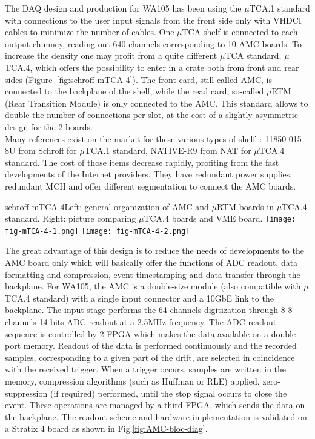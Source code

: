 The DAQ design and production for WA105 has been using the $\mu$TCA.1 standard with connections to the user input signals from the front side only with VHDCI cables to minimize the number of cables. One $\mu$TCA shelf is connected to each output chimney, reading out 640 channels corresponding to 10 AMC boards. To increase the density one may profit from a quite different $\mu$TCA standard, $\mu$TCA.4, which offers the possibility to enter in a crate both from front and rear sides (Figure~\ref{fig:schroff-mTCA-4}). The front card, still called AMC, is connected to the backplane of the shelf, while the read card, so-called $\mu$RTM (Rear Transition Module) is only connected to the AMC. This standard allows to double the number of connections per slot, at the cost of a slightly asymmetric design for the 2 boards. \\
Many references exist on the market for these various types of shelf~: 11850-015 8U from Schroff for $\mu$TCA.1 standard, NATIVE-R9 from NAT for $\mu$TCA.4 standard. The cost of those items decrease rapidly, profiting from the fast developments of the Internet providers. They have redundant power supplies, redundant MCH and offer different segmentation to connect the AMC boards.  


\begin{cdrfigure}{schroff-mTCA-4}{\small Left: general organization of AMC and $\mu$RTM boards in $\mu$TCA.4 standard. Right: picture comparing $\mu$TCA.4 boards and VME board.}
\texttt{[image: fig-mTCA-4-1.png]} \hfill
\texttt{[image: fig-mTCA-4-2.png]}
\end{cdrfigure}


The great advantage of this design is to reduce the needs of developments to the AMC board only which will basically offer the functions of ADC readout, data formatting and compression, event timestamping and data transfer through the backplane. For WA105, the AMC is a double-size module (also compatible with $\mu$TCA.4 standard) with a single input connector and a 10GbE link to the backplane. The input stage performs the 64 channels digitization through 8 8-channels 14-bits ADC readout at a 2.5MHz frequency. The ADC readout sequence is controlled by 2 FPGA which makes the data available on a double port memory. Readout of the data is performed continuously and the recorded samples, corresponding to a given part of the drift, are selected in coincidence with the received trigger. When a trigger occurs, samples are written in the memory, compression algorithms (such as Huffman or RLE) applied, zero-suppression (if required) performed, until the stop signal occurs to close the event. These operations are managed by a third FPGA, which sends the data on the backplane.  The readout scheme and hardware implementation is validated on a Stratix 4 board as shown in Fig.\ref{fig:AMC-bloc-diag}.

